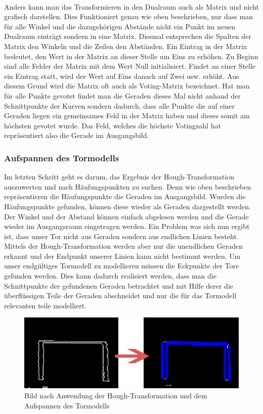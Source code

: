 \documentclass[a4paper,12pt]{article}
\begin{document}
\\
Anders kann man das Transformieren in den Dualraum auch als Matrix und nicht grafisch darstellen. Dies Funktioniert genau wie oben beschrieben, nur dass man für alle Winkel und die dazugehörigen Abstände nicht ein Punkt im neuen Dualraum einträgt sondern in eine Matrix. Diesmal entsprechen die Spalten der Matrix den Winkeln und die Zeilen den Abständen. Ein Eintrag in der Matrix bedeutet, den Wert in der Matrix an dieser Stelle um Eins zu erhöhen. Zu Beginn sind alle Felder der Matrix mit dem Wert Null initialisiert. Findet an einer Stelle ein Eintrag statt, wird der Wert auf Eins danach auf Zwei usw. erhöht. Aus diesem Grund wird die Matrix oft auch als Voting-Matrix bezeichnet. Hat man für alle Punkte gevotet findet man die Geraden dieses Mal nicht anhand der Schnittpunkte der Kurven sondern dadurch, dass alle Punkte die auf einer Geraden liegen ein gemeinsames Feld in der Matrix haben und dieses somit am höchsten gevotet wurde. Das Feld, welches die höchste Votingzahl hat repräsentiert also die Gerade im Ausgangsbild.

\subsubsection{Aufspannen des Tormodells}
Im letzten Schritt geht es darum, das Ergebnis der Hough-Transformation auszuwerten und nach Häufungspunkten zu suchen. Denn wie oben beschrieben repräsentieren die Häufungspunkte die Geraden im Ausgangsbild. Wurden die Häufungspunkte gefunden, können diese wieder als Geraden dargestellt werden. Der Winkel und der Abstand können einfach abgelesen werden und die Gerade wieder im Ausgangsraum eingetragen werden. Ein Problem was sich nun ergibt ist, dass unser Tor nicht aus Geraden sondern aus endlichen Linien besteht. Mittels der Hough-Transformation werden aber nur die unendlichen Geraden erkannt und der Endpunkt unserer Linien kann nicht bestimmt werden. Um unser endgültiges Tormodell zu modellieren müssen die Eckpunkte der Tore gefunden werden. Dies kann dadurch realisiert werden, dass man die Schnittpunkte der gefundenen Geraden betrachtet und mit Hilfe derer die überflüssigen Teile der Geraden abschneidet und nur die für das Tormodell relevanten teile modelliert.
\begin{figure}[H]
\includegraphics[scale=0.6]{aufspannen.jpg}
\caption{Bild nach Anwendung der Hough-Transformation und dem Aufspannen des Tormodells}
\label{fig:aufspannen}
\end{figure}
\end{document}

